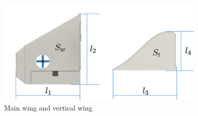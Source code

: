 \begin{figure}[h]
	\begin{center}
		\includegraphics[clip,width = 10.0cm, bb=0 0 500 250]{./z_figure_files/chapter2/10_Wings.png}
		\caption{Main wing and vertical wing}
		\label{fig:wings}
	\end{center}
\end{figure}

